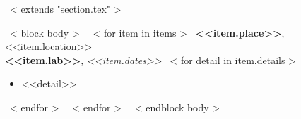 ~< extends "section.tex" >~

~< block body >~
    ~< for item in items >~
        {\bf <<item.place>>}, <<item.location>> \\
        {\bf <<item.lab>>}, {\it <<item.dates>> }
        ~< for detail in item.details >~
        \begin{itemize}
          \item <<detail>>
        \end{itemize}
        ~< endfor >~
    ~< endfor >~
~< endblock body >~
